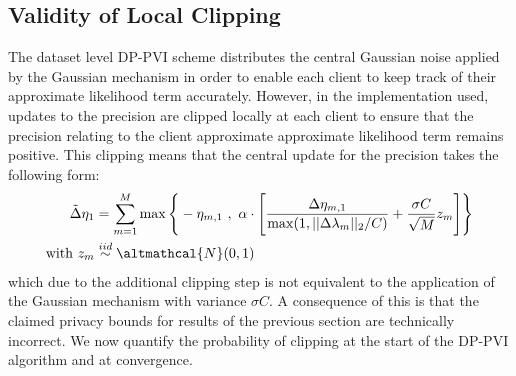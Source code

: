 \subsection{Validity of Local Clipping}
The dataset level DP-PVI scheme distributes the central Gaussian noise applied by the Gaussian mechanism in order to enable each client to keep track of their approximate likelihood term accurately. However, in the implementation used, updates to the precision are clipped locally at each client to ensure that the precision relating to the client approximate approximate likelihood term remains positive. This clipping means that the central update for the precision takes the following form:
\begin{align}
\tilde{\Delta} \eta_1 &= \sum_{m=1}^{M} \max \Bigg \lbrace -\eta_{m, 1}\ ,\ \alpha \cdot \Bigg[ \frac{\Delta \eta_{m, 1}}{\max(1, || \Delta \lambda_m||_2 / C)} + \frac{\sigma C}{\sqrt{M}} z_m \Bigg]   \Bigg \rbrace  \\\text{with }z_m &\stackrel{iid}{\sim} \altmathcal{N}(0, 1)
\end{align}
which due to the additional clipping step is not equivalent to the application of the Gaussian mechanism with variance $\sigma C$. A consequence of this is that the claimed privacy bounds for results of the previous section are technically incorrect. We now quantify the probability of clipping at the start of the DP-PVI algorithm and at convergence.

